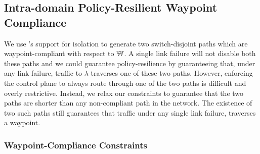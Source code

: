 
%









\subsection{Intra-domain Policy-Resilient Waypoint Compliance}\label{sec:ospfwaypoint}
We use \genesis's
support for isolation to generate two switch-disjoint paths
which are waypoint-compliant with respect to $\mathbb{W}$. A single link
failure will not disable both these paths
and we could guarantee policy-resilience by 
guaranteeing that, under any link failure,
traffic to $\lambda$ 
traverses one of these two paths. However, enforcing the control plane to 
always route through one of the two paths is difficult and overly 
restrictive. 
Instead, we relax our constraints to guarantee that
the two paths are shorter than any non-compliant path in 
the network. The existence of two such paths still guarantees that 
traffic
under any single link failure,
 traverses a waypoint. 



\subsubsection{Waypoint-Compliance Constraints} \hspace*{4mm}


